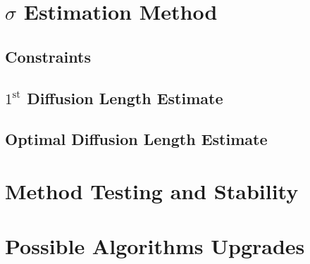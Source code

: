\documentclass[../../CompleteThesis2/Complete_2ndDraft]{subfiles}
\begin{document}
\section[$\sigma$ Estimation Method][$\sigma$ Estimation Method]{$\sigma$ Estimation Method}
\label{Sec:Method_SigmaMethod}

\subsection[Constraints][Constraints]{Constraints}
\label{Subsec:Method_SigmaMethod_Constraints}

\subsection[$1^{\text{st}}\sigma$ Estimate][$1^{\text{st}}\sigma$ Estimate]{$1^{\text{st}}$ Diffusion Length Estimate}
\label{Subsec:Method_SigmaMethod_1stEstimate}

\subsection[Optimal $\sigma$ Estimate][Optimal $\sigma$ Estimate]{Optimal Diffusion Length Estimate}
\label{Subsec:Method_SigmaMethod_OptEstimate} 


\section[Testing and Stability][Testing and Stability]{Method Testing and Stability}
\label{Sec:Method_TestStab}

\section[Upgrades][Upgrades]{Possible Algorithms Upgrades}
\label{Sec:Method_Upgrades}
\end{document}
